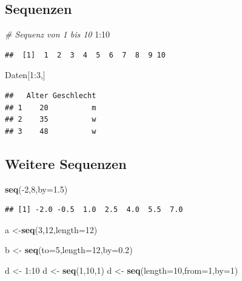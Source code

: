 \documentclass[]{article}
\newenvironment{Shaded}{\begin{snugshade}}{\end{snugshade}}
\newcommand{\KeywordTok}[1]{\textcolor[rgb]{0.13,0.29,0.53}{\textbf{{#1}}}}
\newcommand{\DataTypeTok}[1]{\textcolor[rgb]{0.13,0.29,0.53}{{#1}}}
\newcommand{\DecValTok}[1]{\textcolor[rgb]{0.00,0.00,0.81}{{#1}}}
\newcommand{\FloatTok}[1]{\textcolor[rgb]{0.00,0.00,0.81}{{#1}}}
\newcommand{\StringTok}[1]{\textcolor[rgb]{0.31,0.60,0.02}{{#1}}}
\newcommand{\CommentTok}[1]{\textcolor[rgb]{0.56,0.35,0.01}{\textit{{#1}}}}
\newcommand{\NormalTok}[1]{{#1}}
\begin{document}
\subsection{Sequenzen}\label{sequenzen}

\begin{Shaded}
\begin{Highlighting}[]
\CommentTok{# Sequenz von 1 bis 10}
\DecValTok{1}\NormalTok{:}\DecValTok{10}
\end{Highlighting}
\end{Shaded}

\begin{verbatim}
##  [1]  1  2  3  4  5  6  7  8  9 10
\end{verbatim}

\begin{Shaded}
\begin{Highlighting}[]
\NormalTok{Daten[}\DecValTok{1}\NormalTok{:}\DecValTok{3}\NormalTok{,]}
\end{Highlighting}
\end{Shaded}

\begin{verbatim}
##   Alter Geschlecht
## 1    20          m
## 2    35          w
## 3    48          w
\end{verbatim}

\subsection{Weitere Sequenzen}\label{weitere-sequenzen}

\begin{Shaded}
\begin{Highlighting}[]
\KeywordTok{seq}\NormalTok{(-}\DecValTok{2}\NormalTok{,}\DecValTok{8}\NormalTok{,}\DataTypeTok{by=}\FloatTok{1.5}\NormalTok{)}
\end{Highlighting}
\end{Shaded}

\begin{verbatim}
## [1] -2.0 -0.5  1.0  2.5  4.0  5.5  7.0
\end{verbatim}

\begin{Shaded}
\begin{Highlighting}[]
\NormalTok{a <-}\KeywordTok{seq}\NormalTok{(}\DecValTok{3}\NormalTok{,}\DecValTok{12}\NormalTok{,}\DataTypeTok{length=}\DecValTok{12}\NormalTok{)}

\NormalTok{b <-}\StringTok{ }\KeywordTok{seq}\NormalTok{(}\DataTypeTok{to=}\DecValTok{5}\NormalTok{,}\DataTypeTok{length=}\DecValTok{12}\NormalTok{,}\DataTypeTok{by=}\FloatTok{0.2}\NormalTok{)}

\NormalTok{d <-}\StringTok{ }\DecValTok{1}\NormalTok{:}\DecValTok{10}
\NormalTok{d <-}\StringTok{ }\KeywordTok{seq}\NormalTok{(}\DecValTok{1}\NormalTok{,}\DecValTok{10}\NormalTok{,}\DecValTok{1}\NormalTok{)}
\NormalTok{d <-}\StringTok{ }\KeywordTok{seq}\NormalTok{(}\DataTypeTok{length=}\DecValTok{10}\NormalTok{,}\DataTypeTok{from=}\DecValTok{1}\NormalTok{,}\DataTypeTok{by=}\DecValTok{1}\NormalTok{)}
\end{Highlighting}
\end{Shaded}
\end{document}
